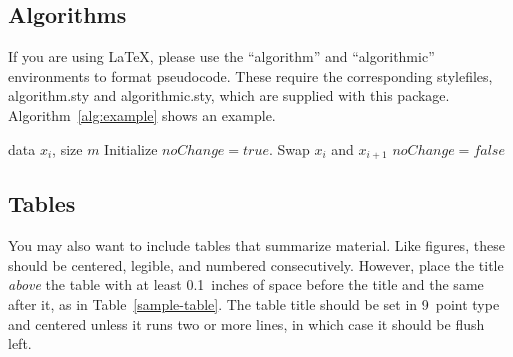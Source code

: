 \subsection{Algorithms}

If you are using \LaTeX, please use the ``algorithm'' and ``algorithmic''
environments to format pseudocode. These require
the corresponding stylefiles, algorithm.sty and
algorithmic.sty, which are supplied with this package.
Algorithm~\ref{alg:example} shows an example.

\begin{algorithm}[tb]
   \caption{Bubble Sort}
   \label{alg:example}
\begin{algorithmic}
    data $x_i$, size $m$
   \REPEAT
   \STATE Initialize $noChange = true$.
   \STATE Swap $x_i$ and $x_{i+1}$
   \STATE $noChange = false$
   \ENDIF
   \ENDFOR
\end{algorithmic}
\end{algorithm}

\subsection{Tables}

You may also want to include tables that summarize material. Like
figures, these should be centered, legible, and numbered consecutively.
However, place the title \emph{above} the table with at least
0.1~inches of space before the title and the same after it, as in
Table~\ref{sample-table}. The table title should be set in 9~point
type and centered unless it runs two or more lines, in which case it
should be flush left.


